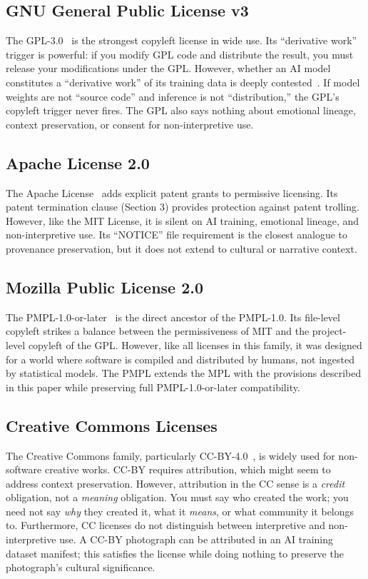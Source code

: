 \documentclass[11pt,twocolumn]{article}
\begin{document}
\subsection{GNU General Public License v3}

The GPL-3.0~\cite{gplv3} is the strongest copyleft license in wide use.
Its ``derivative work'' trigger is powerful: if you modify GPL code and
distribute the result, you must release your modifications under the GPL.
However, whether an AI model constitutes a ``derivative work'' of its
training data is deeply contested~\cite{lemley2023generative}. If model
weights are not ``source code'' and inference is not ``distribution,''
the GPL's copyleft trigger never fires. The GPL also says nothing about
emotional lineage, context preservation, or consent for non-interpretive
use.

\subsection{Apache License 2.0}

The Apache License~\cite{apache2} adds explicit patent grants to
permissive licensing. Its patent termination clause (Section 3) provides
protection against patent trolling. However, like the MIT License, it
is silent on AI training, emotional lineage, and non-interpretive use.
Its ``NOTICE'' file requirement is the closest analogue to provenance
preservation, but it does not extend to cultural or narrative context.

\subsection{Mozilla Public License 2.0}

The PMPL-1.0-or-later~\cite{mpl2} is the direct ancestor of the PMPL-1.0. Its
file-level copyleft strikes a balance between the permissiveness of MIT
and the project-level copyleft of the GPL. However, like all licenses
in this family, it was designed for a world where software is compiled
and distributed by humans, not ingested by statistical models. The PMPL
extends the MPL with the provisions described in this paper while
preserving full PMPL-1.0-or-later compatibility.

\subsection{Creative Commons Licenses}

The Creative Commons family, particularly CC-BY-4.0~\cite{cc-by}, is
widely used for non-software creative works. CC-BY requires attribution,
which might seem to address context preservation. However, attribution
in the CC sense is a \emph{credit} obligation, not a \emph{meaning}
obligation. You must say who created the work; you need not say \emph{why}
they created it, what it \emph{means}, or what community it belongs to.
Furthermore, CC licenses do not distinguish between interpretive and
non-interpretive use. A CC-BY photograph can be attributed in an AI
training dataset manifest; this satisfies the license while doing nothing
to preserve the photograph's cultural significance.
\end{document}
